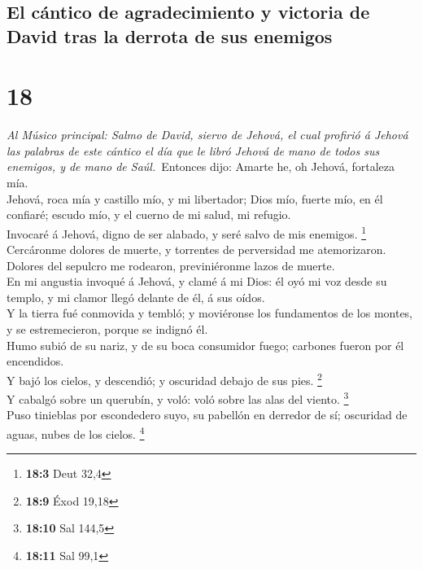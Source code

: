 \hypertarget{el-cuxe1ntico-de-agradecimiento-y-victoria-de-david-tras-la-derrota-de-sus-enemigos}{%
\subsection{El cántico de agradecimiento y victoria de David tras la
derrota de sus
enemigos}\label{el-cuxe1ntico-de-agradecimiento-y-victoria-de-david-tras-la-derrota-de-sus-enemigos}}

\hypertarget{section-17}{%
\section{18}\label{section-17}}

 \emph{Al Músico principal: Salmo de David, siervo de
Jehová, el cual profirió á Jehová las palabras de este cántico el día
que le libró Jehová de mano de todos sus enemigos, y de mano de
Saúl.}~Entonces dijo: Amarte he, oh Jehová, fortaleza mía.\\
 Jehová, roca mía y castillo mío, y mi libertador; Dios mío,
fuerte mío, en él confiaré; escudo mío, y el cuerno de mi salud, mi
refugio.\\
 Invocaré á Jehová, digno de ser alabado, y seré salvo de
mis enemigos. \footnote{\textbf{18:3} Deut 32,4}\\
 Cercáronme dolores de muerte, y torrentes de perversidad me
atemorizaron.\\
 Dolores del sepulcro me rodearon, previniéronme lazos de
muerte.\\
 En mi angustia invoqué á Jehová, y clamé á mi Dios: él oyó
mi voz desde su templo, y mi clamor llegó delante de él, á sus oídos.\\
 Y la tierra fué conmovida y tembló; y moviéronse los
fundamentos de los montes, y se estremecieron, porque se indignó él.\\
 Humo subió de su nariz, y de su boca consumidor fuego;
carbones fueron por él encendidos.\\
 Y bajó los cielos, y descendió; y oscuridad debajo de sus
pies. \footnote{\textbf{18:9} Éxod 19,18}\\
 Y cabalgó sobre un querubín, y voló: voló sobre las alas
del viento. \footnote{\textbf{18:10} Sal 144,5}\\
 Puso tinieblas por escondedero suyo, su pabellón en
derredor de sí; oscuridad de aguas, nubes de los cielos. \footnote{\textbf{18:11}
  Sal 99,1}\\
